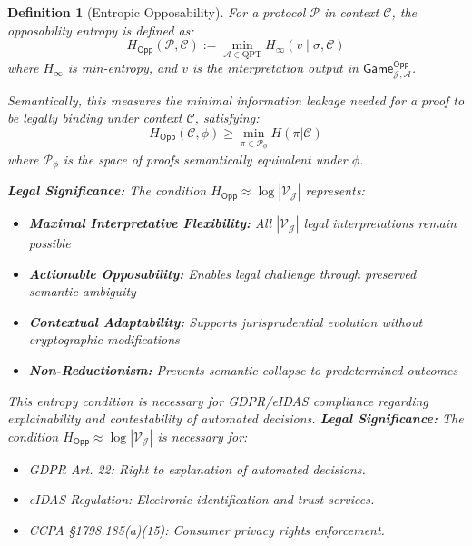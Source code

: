 \documentclass[preprint,12pt]{elsarticle}
\newtheorem{definition}{Definition}[section]
\begin{document}
            \begin{definition}[Entropic Opposability]\label{def:unified_opposability}
                For a protocol $\mathcal{P}$ in context $\mathcal{C}$, the opposability entropy is defined as:
                \begin{equation}\label{eq:opposability_protocol}
                    H_{\mathsf{Opp}}(\mathcal{P}, \mathcal{C}) := \min_{\mathcal{A} \in \mathrm{QPT}} H_\infty(v \mid \sigma, \mathcal{C})
                \end{equation}
                where $H_\infty$ is min-entropy, and $v$ is the interpretation output in $\mathsf{Game}_{\mathcal{J},\mathcal{A}}^{\mathsf{Opp}}$.

                Semantically, this measures the minimal information leakage needed for a proof to be legally binding under context $\mathcal{C}$, satisfying:
                \begin{equation}\label{eq:opposability_semantic}
                    H_{\mathsf{Opp}}(\mathcal{C}, \phi) \geq \min_{\pi \in \mathcal{P}_\phi} H(\pi|\mathcal{C})
                \end{equation}
                where $\mathcal{P}_\phi$ is the space of proofs semantically equivalent under $\phi$.
                
                \textbf{Legal Significance:} The condition $H_{\mathsf{Opp}} \approx \log |\mathcal{V}_{\mathcal{J}}|$ represents:
                \begin{itemize}
                    \item \textbf{Maximal Interpretative Flexibility:} All $|\mathcal{V}_{\mathcal{J}}|$ legal interpretations remain possible
                    \item \textbf{Actionable Opposability:} Enables legal challenge through preserved semantic ambiguity
                    \item \textbf{Contextual Adaptability:} Supports jurisprudential evolution without cryptographic modifications
                    \item \textbf{Non-Reductionism:} Prevents semantic collapse to predetermined outcomes
                \end{itemize}
                This entropy condition is necessary for GDPR/eIDAS compliance regarding explainability and contestability of automated decisions.
            \textbf{Legal Significance:} The condition $H_{\mathsf{Opp}} \approx \log |\mathcal{V}_{\mathcal{J}}|$ is necessary for:
            \begin{itemize}
                \item GDPR Art. 22: Right to explanation of automated decisions.
                \item eIDAS Regulation: Electronic identification and trust services.
                \item CCPA §1798.185(a)(15): Consumer privacy rights enforcement.
            \end{itemize}
        \end{definition}
\end{document}
